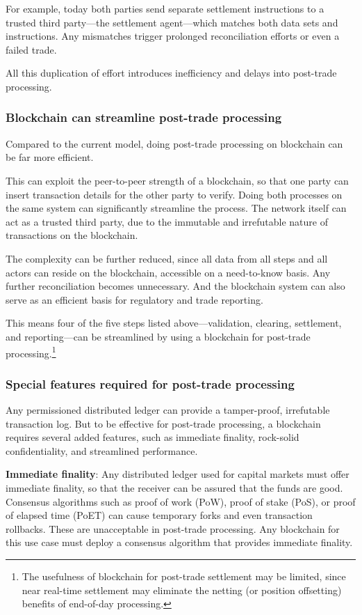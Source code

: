 For example, today both parties send separate settlement instructions to a trusted third party---the settlement agent---which matches both data sets and instructions. Any mismatches trigger prolonged reconciliation efforts or even a failed trade. 

All this duplication of effort introduces inefficiency and delays into post-trade processing.

\subsubsection{Blockchain can streamline post-trade processing}
Compared to the current model, doing post-trade processing on blockchain can be far more efficient. 

This can exploit the peer-to-peer strength of a blockchain, so that one party can insert transaction details for the other party to verify. 
Doing both processes on the same system can significantly streamline the process. The network itself can act as a trusted third party, due to the immutable and irrefutable nature of transactions on the blockchain.

The complexity can be further reduced, since all data from all steps and all actors can reside on the blockchain, accessible on a need-to-know basis. 
Any further reconciliation becomes unnecessary. And the blockchain system can also serve as an efficient basis for regulatory and trade reporting.

This means four of the five steps listed above---validation, clearing, settlement, and reporting---can be streamlined by using a blockchain for post-trade processing.\footnote{The usefulness of blockchain for post-trade settlement may be limited, since near real-time settlement may eliminate the netting (or position offsetting) benefits of end-of-day processing.} 

\subsubsection{Special features required for post-trade processing}
Any permissioned distributed ledger can provide a tamper-proof, irrefutable transaction log. But to be effective for post-trade processing, a blockchain requires several added features, such as immediate finality, rock-solid confidentiality, and streamlined performance. 

\textbf{Immediate finality}: Any distributed ledger used for capital markets must offer immediate finality, so that the receiver can be assured that the funds are good. 
Consensus algorithms such as proof of work (PoW), proof of stake (PoS), or proof of elapsed time (PoET) can cause temporary forks and even transaction rollbacks. 
These are unacceptable in post-trade processing. 
Any blockchain for this use case must deploy a consensus algorithm that provides immediate finality.

